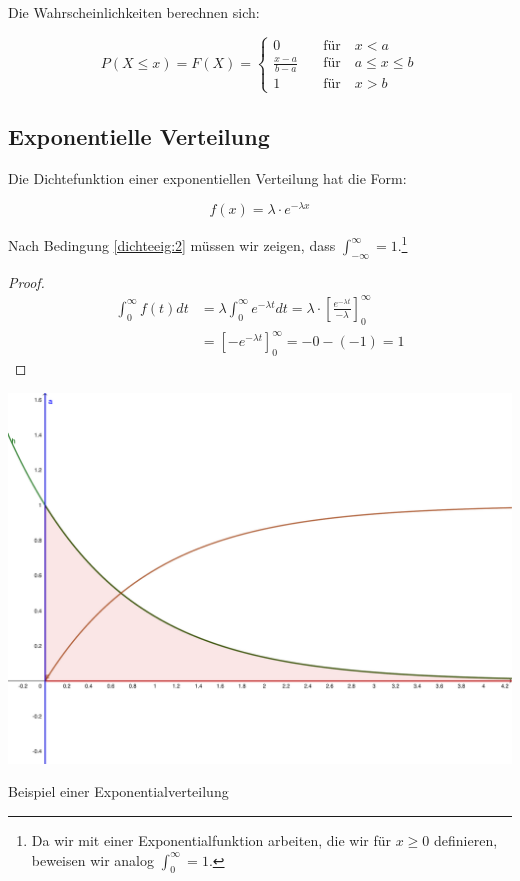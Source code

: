 \documentclass{tufte-handout}
\theoremstyle{own}
\begin{document}
Die Wahrscheinlichkeiten berechnen sich:

\begin{equation}
P(X\leq x) = F(X) = \begin{cases}
0 \hspace{1em} & \text{für}  \hspace{1em} x < a \\
\frac{x-a}{b-a} \hspace{1em} & \text{für}  \hspace{1em} a \leq x \leq b \\
1 \hspace{1em} & \text{für}  \hspace{1em} x > b
\end{cases}
\end{equation}

\subsection{Exponentielle Verteilung}

Die Dichtefunktion einer exponentiellen Verteilung hat die Form:

\begin{equation}
	f(x) = \lambda \cdot e^{-\lambda x}
\end{equation}

Nach Bedingung \eqref{dichteeig:2} müssen wir zeigen, dass
$\int_{-\infty}^\infty = 1$.\footnote{Da wir mit einer Exponentialfunktion arbeiten, die wir für $x\geq0$ definieren, beweisen wir analog $\int_0^\infty = 1$.}

\begin{proof}
\begin{align*}
\int_0^\infty f(t) dt &= \lambda \int_0^\infty e^{-\lambda t} dt = \lambda \cdot [\frac{e^{-\lambda t}}{- \lambda}]_0^\infty \\
	&= [-e^{-\lambda t}]_0^\infty = -0 - (-1) = 1
\end{align*}
\end{proof}

\begin{marginfigure}
	\includegraphics{exponentialverteilung}
	\caption{Beispiel einer Exponentialverteilung}
\end{marginfigure}
\end{document}
